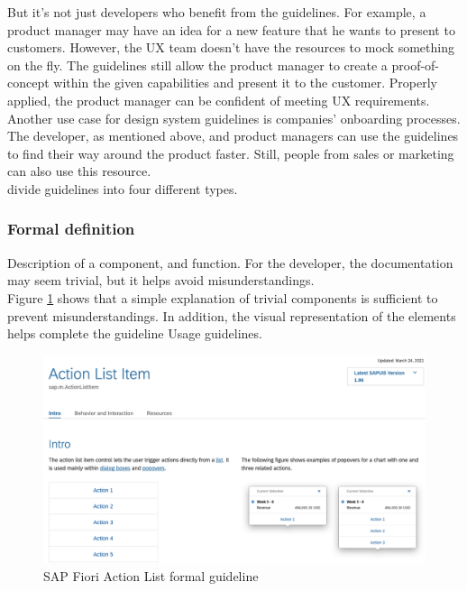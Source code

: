 But it's not just developers who benefit from the guidelines. For example, a product manager may have an idea for a new feature that he wants to present to customers. However, the UX team doesn't have the resources to mock something on the fly. The guidelines still allow the product manager to create a proof-of-concept within the given capabilities and present it to the customer. Properly applied, the product manager can be confident of meeting UX requirements.  \cite{vesselov_building_2019} \\

Another use case for design system guidelines is companies' onboarding processes. The developer, as mentioned above, and product managers can use the guidelines to find their way around the product faster. Still, people from sales or marketing can also use this resource. \cite{vesselov_building_2019} \\

\citet*{vesselov_building_2019} divide guidelines into four different types.

\subsubsection{Formal definition} 
Description of a component, and function. For the developer, the documentation may seem trivial, but it helps avoid misunderstandings. \cite{vesselov_building_2019}  \\
Figure \ref{fiori_action_list} shows that a simple explanation of trivial components is sufficient to prevent misunderstandings. In addition, the visual representation of the elements helps complete the guideline Usage guidelines.
\begin{figure}[ht]
\centerline{\includegraphics[width=\linewidth]{images/fiori_action-list_formal.png}}
\caption{SAP Fiori Action List formal guideline \cite{sap_fiori_nodate}}
\label{fiori_action_list}
\end{figure}
\newpage

